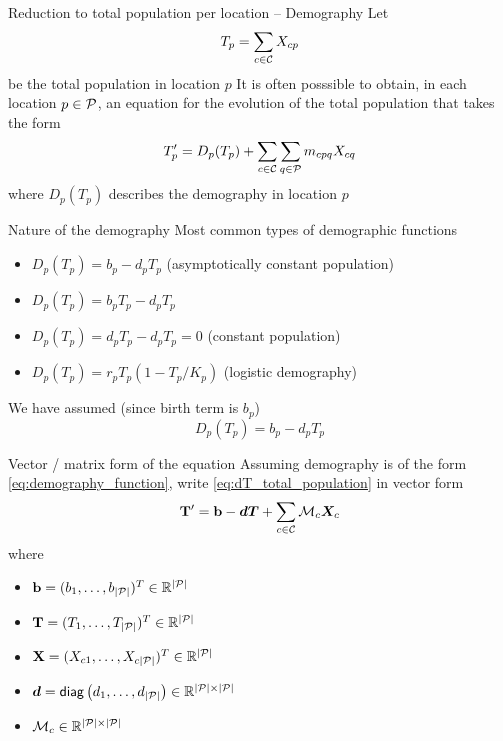 \documentclass[aspectratio=169]{beamer}\usepackage[]{graphicx}\usepackage[]{xcolor}
\begin{document}
\begin{frame}{Reduction to total population per location -- Demography}
Let 
\[
	T_p = \sum_{c\in\C}X_{cp}
\]
be the total population in location $p$
\vfill
It is often posssible to obtain, in each location $p\in\P$, an equation for the evolution of the total population that takes the form
\begin{equation}\label{eq:dT_total_population}
	T_p' = 
	D_p(T_p)+\sum_{c\in\C}\sum_{q\in\P}m_{cpq}X_{cq}
\end{equation}
where $D_p(T_p)$ describes the demography in location $p$
\end{frame}

\begin{frame}{Nature of the demography}
	Most common types of demographic functions
	\begin{itemize}
		\item $D_p(T_p)=b_p-d_pT_p$ (asymptotically constant population)
		\item $D_p(T_p)=b_pT_p-d_pT_p$ 
		\item $D_p(T_p)=d_pT_p-d_pT_p=0$ (constant population)
		\item $D_p(T_p)=r_pT_p(1-T_p/K_p)$ (logistic demography)
	\end{itemize}
	\vfill
	We have assumed (since birth term is $b_p$) 
	\begin{equation}\label{eq:demography_function}
		D_p(T_p)=b_p-d_pT_p
	\end{equation}
\end{frame}

\begin{frame}{Vector / matrix form of the equation}
Assuming demography is of the form \eqref{eq:demography_function}, write \eqref{eq:dT_total_population} in vector form
\begin{equation}\label{sys:dN_general} 
	\mathbf{T}'=\mathbf{b}-\bd\bT+\sum_{c\in\C}\mathcal{M}_c\bX_{c}	
\end{equation}
where 
\begin{itemize}
	\item $\mathbf{b}=(b_1,\ldots,b_{|\mathcal{P}|})^T\in\IR^{|\P|}$
	\item $\mathbf{T}=(T_1,\ldots,T_{|\mathcal{P}|})^T\in\IR^{|\P|}$
	\item $\mathbf{X}=(X_{c1},\ldots,X_{c{|\mathcal{P}|}})^T\in\IR^{|\P|}$
	\item $\bd=\mathsf{diag}\left(d_1,\ldots,d_{|\mathcal{P}|}\right)\in\IR^{|\mathcal{P}|\times|\mathcal{P}|}$
	\item $\mathcal{M}_c\in\IR^{|\mathcal{P}|\times|\mathcal{P}|}$
\end{itemize}

\end{frame}
\end{document}
